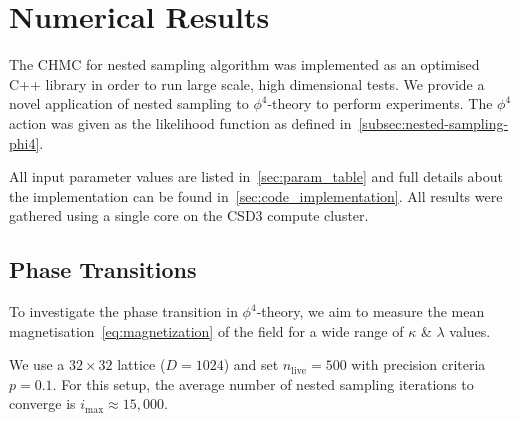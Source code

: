 \documentclass[11pt]{article}
\begin{document}
\section{Numerical Results}\label{sec:numerical_results}
    The CHMC for nested sampling algorithm was implemented as an optimised C++ library in order to run large scale,
    high dimensional tests.
    We provide a novel application of nested sampling to $\phi^4$-theory to perform experiments.
    The $\phi^4$ action was given as the likelihood function as defined in~\cref{subsec:nested-sampling-phi4}.

    All input parameter values are listed in~\cref{sec:param_table} and full details about the implementation
    can be found in~\cref{sec:code_implementation}.
    All results were gathered using a single core on the CSD3 compute cluster.

\subsection{Phase Transitions}\label{subsec:phase_transition}
    To investigate the phase transition in $\phi^4$-theory, we aim to measure the mean magnetisation~\eqref{eq:magnetization}
    of the field for a wide range of $\kappa$ \& $\lambda$ values.

    We use a $32 \times 32$ lattice ($D=1024$) and set $n_{\text{live}}=500$ with precision criteria $p=0.1$.
    For this setup, the average number of nested sampling iterations to converge is $i_{\max} \approx 15,000$.
\end{document}
